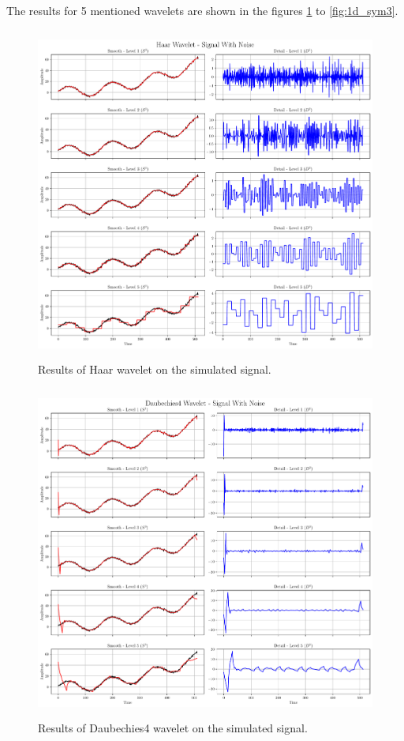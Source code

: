 \documentclass[12pt]{article}
\begin{document}
	The results for 5 mentioned wavelets are shown in the figures \ref{fig:1d_haar} to \ref{fig:1d_sym3}.
	
	\begin{figure}[!h]
		\centering
		\includegraphics[height=11cm]{../Tests/Outputs/HaarWavelet_SignalWithNoise.pdf}
		\caption{Results of Haar wavelet on the simulated signal.}
		\label{fig:1d_haar}
	\end{figure}

	\begin{figure}[!h]
		\centering
		\includegraphics[height=11cm]{../Tests/Outputs/Daubechies4Wavelet_SignalWithNoise.pdf}
		\caption{Results of Daubechies4 wavelet on the simulated signal.}
		\label{fig:1d_db4}
	\end{figure}	
	
\end{document}
